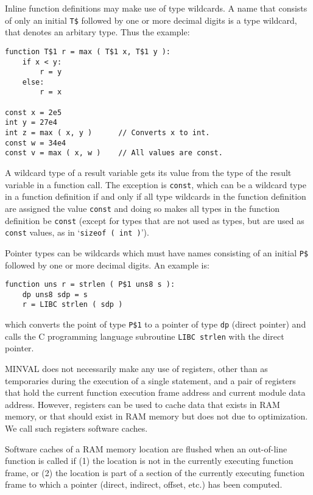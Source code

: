 \documentclass[12pt]{article}
\newenvironment{indpar}[1][0.3in]%
	{\begin{list}{}%
		     {\setlength{\itemsep}{0in}%
		      \setlength{\topsep}{0in}%
		      \setlength{\parsep}{1ex}%
		      \setlength{\labelwidth}{#1}%
		      \setlength{\leftmargin}{#1}%
		      \addtolength{\leftmargin}{\labelsep}}%
	 \item}%
	{\end{list}}
\begin{document}
Inline function definitions may make use of type wildcards.
A name that consists of only an initial {\tt T\$}
followed by one or more decimal digits is a type wildcard, that denotes
an arbitary type.  Thus the example:

\begin{indpar}\begin{verbatim}
function T$1 r = max ( T$1 x, T$1 y ):
    if x < y:
        r = y
    else:
        r = x

const x = 2e5
int y = 27e4
int z = max ( x, y )      // Converts x to int.
const w = 34e4
const v = max ( x, w )    // All values are const.
\end{verbatim}\end{indpar}

A wildcard type of a result variable gets its value from the
type of the result variable in a function call.  The exception
is {\tt const}, which can be a wildcard type in a function
definition if and only if all type wildcards in the function definition
are assigned the value {\tt const} and doing so makes
all types in the function definition be {\tt const}
(except for types that are not used as types, but are used as
{\tt const} values, as in `{\tt sizeof ( int )}').

Pointer types can be wildcards which must have names consisting
of an initial {\tt P\$} followed by one or more decimal digits.
An example is:

\begin{indpar}\begin{verbatim}
function uns r = strlen ( P$1 uns8 s ):
    dp uns8 sdp = s
    r = LIBC strlen ( sdp )
\end{verbatim}\end{indpar}

which converts the point of type {\tt P\$1} to a pointer of
type {\tt dp} (direct pointer) and calls the C programming
language subroutine {\tt LIBC strlen} with the direct pointer.

MINVAL does not necessarily make any use of registers, other
than as temporaries during the execution of a single statement,
and a pair of registers that hold the current function
execution frame address and current module data address.
However, registers can be used to cache data that exists in
RAM memory, or that should exist in RAM memory but does not
due to optimization.  We call such registers software
caches.

Software caches of a RAM memory location are flushed when an out-of-line
function is called if (1) the location is not in the currently
executing function frame, or (2) the location is part of a
section of the currently executing function frame to which
a pointer (direct, indirect, offset, etc.) has been computed.
\end{document}
